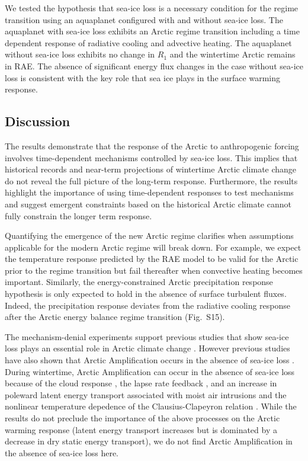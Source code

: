 \documentclass[draft]{agujournal2019}
\begin{document}
We tested the hypothesis that sea-ice loss is a necessary condition for the regime transition using an aquaplanet configured with and without sea-ice loss. The aquaplanet with sea-ice loss exhibits an Arctic regime transition including a time dependent response of radiative cooling and advective heating. The aquaplanet without sea-ice loss exhibits no change in $R_1$ and the wintertime Arctic remains in RAE. The absence of significant energy flux changes in the case without sea-ice loss is consistent with the key role that sea ice plays in the surface warming response.

\subsection{Discussion}
The results demonstrate that the response of the Arctic to anthropogenic forcing involves time-dependent mechanisms controlled by sea-ice loss. This implies that historical records and near-term projections of wintertime Arctic climate change do not reveal the full picture of the long-term response. Furthermore, the results highlight the importance of using time-dependent responses to test mechanisms \cite{shaw2019} and suggest emergent constraints based on the historical Arctic climate cannot fully constrain the longer term response.

Quantifying the emergence of the new Arctic regime clarifies when assumptions applicable for the modern Arctic regime will break down. For example, we expect the temperature response predicted by the RAE model \cite{payne2015,cronin2016} to be valid for the Arctic prior to the regime transition but fail thereafter when convective heating becomes important. Similarly, the energy-constrained Arctic precipitation response hypothesis \cite{pithan2021} is only expected to hold in the absence of surface turbulent fluxes. Indeed, the precipitation response deviates from the radiative cooling response after the Arctic energy balance regime transition (Fig.~S15).

The mechanism-denial experiments support previous studies that show sea-ice loss plays an essential role in Arctic climate change \cite{screen2010,boeke2018,dai2019,shaw2022}. However previous studies have also shown that Arctic Amplification occurs in the absence of sea-ice loss \cite{alexeev2005,kim2018,merlis2018, previdi2020}. During wintertime, Arctic Amplification can occur in the absence of sea-ice loss because of the cloud response \cite{kim2018}, the lapse rate feedback \cite{previdi2020}, and an increase in poleward latent energy transport associated with moist air intrusions \cite{woods2013,woods2016,pithan2018} and the nonlinear temperature depedence of the Clausius-Clapeyron relation \cite{manabe1980,hwang2011,shaw2016c,graversen2016,yoshimori2017,merlis2018,feldl2021}. While the results do not preclude the importance of the above processes on the Arctic warming response (latent energy transport increases but is dominated by a decrease in dry static energy transport), we do not find Arctic Amplification in the absence of sea-ice loss here.
\end{document}
